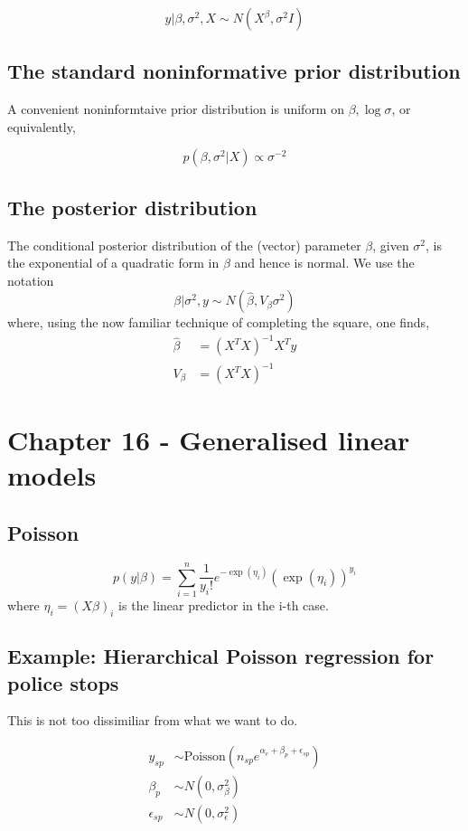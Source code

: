 \documentclass[11pt]{amsart}
\newcommand{\Poisson}[1] {\text{Poisson} ( #1 )}
\begin{document}
\[
	y|\beta, \sigma^2, X \sim N(X^\beta, \sigma^2 I)
\]

\subsection{The standard noninformative prior distribution}
A convenient noninformtaive prior distribution is uniform on $\beta, 
\log{\sigma}$, or equivalently,

\[
	p(\beta, \sigma^2|X) \propto \sigma^{-2}
\]

\subsection{The posterior distribution}

The conditional posterior distribution of the (vector) parameter $\beta$,
given $\sigma^2$, is the exponential of a quadratic form in $\beta$ and hence
is normal. We use the notation
\[
	\beta|\sigma^2, y \sim N(\hat{\beta}, V_{\beta}\sigma^2)
\]
where, using the now familiar technique of completing the square, one finds,
\begin{align*}
	\hat{\beta} &= (X^T X)^{-1} X^T y\\
	V_{\beta} &= (X^T X)^{-1}
\end{align*}

\section{Chapter 16 - Generalised linear models}
\subsection{Poisson}
\[
	p(y|\beta) = \sum_{i=1}^n \frac{1}{y_i !} e^{- \exp{(\eta_i)}} (\exp{(\eta_i)})^{y_i}
\]
where $\eta_i = (X\beta)_i$ is the linear predictor in the i-th case.
\subsection{Example: Hierarchical Poisson regression for police stops}
This is not too dissimiliar from what we want to do.

\begin{align*}
y_{sp} & \sim \Poisson{n_{sp} e^{\alpha_e + \beta_p + \epsilon_{sp}}} \\
\beta_p & \sim N(0, \sigma_\beta^2) \\
\epsilon_{sp} & \sim N(0, \sigma_\epsilon^2)
\end{align*}
\end{document}
